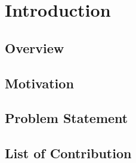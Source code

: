 \setcounter{page}{1}
\section{Introduction}
\subsection{Overview}
\subsection{Motivation}
\subsection{Problem Statement}
\subsection{List of Contribution}